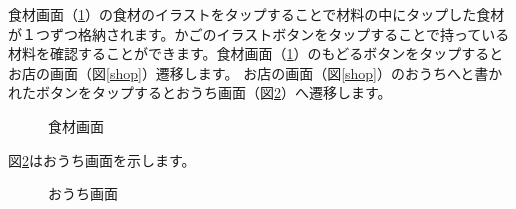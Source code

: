 \documentclass[a4j]{jarticle}
\begin{document}
食材画面（\ref{shop_material}）の食材のイラストをタップすることで材料の中にタップした食材が１つずつ格納されます。かごのイラストボタンをタップすることで持っている材料を確認することができます。食材画面（\ref{shop_material}）のもどるボタンをタップするとお店の画面（図\ref{shop}）遷移します。
お店の画面（図\ref{shop}）のおうちへと書かれたボタンをタップするとおうち画面（図\ref{myhome}）へ遷移します。

\begin{figure}[H]
    \begin{center}
    \caption {食材画面}
    \label{shop_material}
    \end{center}
\end{figure}
図\ref{myhome}はおうち画面を示します。\\

\begin{figure}[H]
    \begin{center}
    \caption {おうち画面}
    \label{myhome}
    \end{center}
\end{figure}
\end{document}
